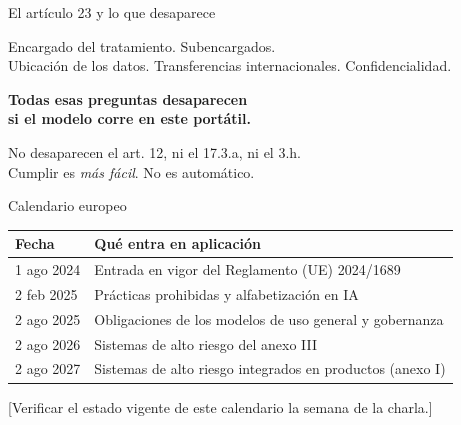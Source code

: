 \documentclass[aspectratio=169,11pt]{beamer}
\newcommand{\bien}[1]{\textcolor{bueno}{\textbf{#1}}}
\begin{document}
\begin{frame}{El artículo 23 y lo que desaparece}
  \begin{center}\large Encargado del tratamiento. Subencargados.\\
  Ubicación de los datos. Transferencias internacionales. Confidencialidad.\end{center}
  \vspace{.6em}
  \pause
  \begin{center}
    \bien{\Large Todas esas preguntas desaparecen}\\[.3em]
    \bien{\Large si el modelo corre en este portátil.}
  \end{center}
  \pause
  \vspace{.9em}
  {\centering\small No desaparecen el art. 12, ni el 17.3.a, ni el 3.h.\\
  Cumplir es \emph{más fácil}. No es automático.\par}
\end{frame}

\begin{frame}{Calendario europeo}
  \small
  \begin{tabular}{@{}ll@{}}
    \toprule
    \textbf{Fecha} & \textbf{Qué entra en aplicación} \\
    \midrule
    1 ago 2024 & Entrada en vigor del Reglamento (UE) 2024/1689 \\
    2 feb 2025 & Prácticas prohibidas y alfabetización en IA \\
    2 ago 2025 & Obligaciones de los modelos de uso general y gobernanza \\
    2 ago 2026 & Sistemas de alto riesgo del anexo III \\
    2 ago 2027 & Sistemas de alto riesgo integrados en productos (anexo I) \\
    \bottomrule
  \end{tabular}

  \vspace{1em}
  \begin{center}\footnotesize\color{acento}
  [Verificar el estado vigente de este calendario la semana de la charla.]
  \end{center}
\end{frame}

\end{document}
